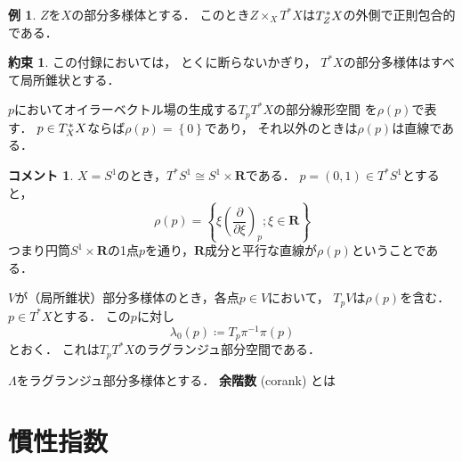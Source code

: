 \documentclass[leqno, 10pt, a4paper, dvipdfmx]{jsarticle}
\theoremstyle{definition}
\newcommand{\rr}{\mathbf{R}}
\numberwithin{equation}{section}
\newcommand{\tpb}[1][]{\mathbin{\mathop{\times}\nolimits_{#1}}}
\theoremstyle{mystyle}
\newtheorem{EG}[AXM]{例}
\newtheorem{CNV}[AXM]{約束}
\newtheorem*{CMT*}{コメント}
\newcommand{\cotb}[1][]{T^{\ast}{#1}}
\newcommand{\conm}[2][]{T_{#1}^{\hspace{0.7pt}\ast}{#2}}
\begin{document}
\begin{EG}
    \(Z\)を\(X\)の部分多様体とする．
    このとき\(Z\tpb[X]\cotb[X]\)は\(\conm[Z]{X}\)の外側で正則包合的である．
\end{EG}

\begin{CNV}
    この付録においては，
    とくに断らないかぎり，
    \(\cotb[X]\)の部分多様体はすべて局所錐状とする．
\end{CNV}

\(p\)においてオイラーベクトル場の生成する\(T_p\cotb[X]\)の部分線形空間
を\(\rho(p)\)で表す．
\(p\in\conm[X]{X}\)ならば\(\rho(p)=\left\{0\right\}\)であり，
それ以外のときは\(\rho(p)\)は直線である．

\begin{CMT*}
    \(X=S^1\)のとき，\(\cotb[S^1]\cong S^1\times \rr\)である．
    \(p=(0,1)\in \cotb[S^1]\)とすると，
    \[
        \rho(p)
        =\left\{
            \xi\left(\frac{\partial}{\partial \xi}\right)_{p}
            ;\xi\in\rr
        \right\}
    \]
    つまり円筒\(S^1\times \rr\)の1点\(p\)を通り，\(\rr\)成分と平行な直線が\(\rho(p)\)ということである．
\end{CMT*}

\(V\)が（局所錐状）部分多様体のとき，各点\(p\in V\)において，
\(T_pV\)は\(\rho(p)\)を含む．\(p\in\cotb[X]\)とする．
この\(p\)に対し\begin{equation}
    \lambda_{0}(p)\coloneqq T_{p}\pi^{-1}\pi(p)
\end{equation}とおく．
これは\(T_{p}\cotb[X]\)のラグランジュ部分空間である．

\(\varLambda\)をラグランジュ部分多様体とする．
\textbf{余階数} (corank) とは























\section{慣性指数}\label{sec:A.3}
\end{document}
